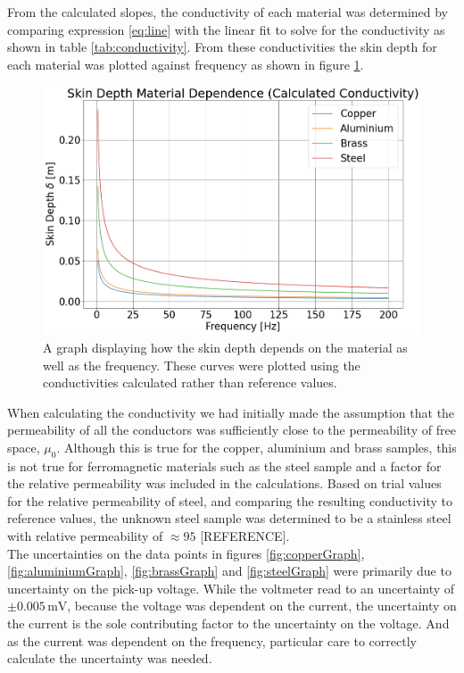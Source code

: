 \documentclass[a4paper,12pt,twocolumn]{article}
\begin{document}
	From the calculated slopes, the conductivity of each material was determined by comparing expression \ref{eq:line} with the linear fit to solve for the conductivity as shown in table \ref{tab:conductivity}. From these conductivities the skin depth for each material was plotted against frequency as shown in figure \ref{fig:skinDepth}.\\
	
	\begin{figure}
		\centering
		\includegraphics[width=\columnwidth]{skinDepthMaterialDependence.png}
		\captionsetup{font=scriptsize}
		\caption{A graph displaying how the skin depth depends on the material as well as the frequency. These curves were plotted using the conductivities calculated rather than reference values.}
		\label{fig:skinDepth}
	\end{figure}	
	
	When calculating the conductivity we had initially made the assumption that the permeability of all the conductors was sufficiently close to the permeability of free space, $\mu_0$. Although this is true for the copper, aluminium and brass samples, this is not true for ferromagnetic materials such as the steel sample and a factor for the relative permeability was included in the calculations. Based on trial values for the relative permeability of steel, and comparing the resulting conductivity to reference values, the unknown steel sample was determined to be a stainless steel with relative permeability of $\approx 95$ [REFERENCE]. \\
	
	The uncertainties on the data points in figures \ref{fig:copperGraph}, \ref{fig:aluminiumGraph}, \ref{fig:brassGraph} and \ref{fig:steelGraph} were primarily due to uncertainty on the pick-up voltage. While the voltmeter read to an uncertainty of $\pm 0.005\,\text{mV}$, because the voltage was dependent on the current, the uncertainty on the current is the sole contributing factor to the uncertainty on the voltage. And as the current was dependent on the frequency, particular care to correctly calculate the uncertainty was needed.\\
	
\end{document}
